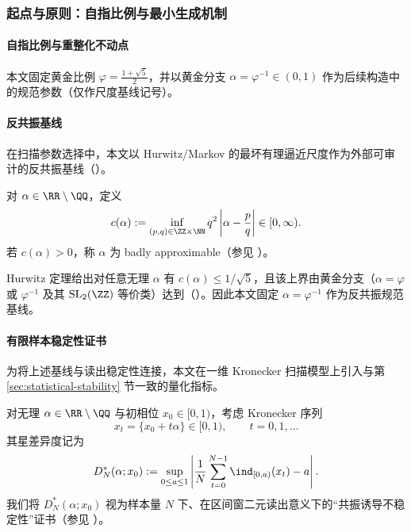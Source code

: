 \subsubsection{起点与原则：自指比例与最小生成机制}

\paragraph{自指比例与重整化不动点}

本文固定黄金比例 \(\varphi=\frac{1+\sqrt5}{2}\)，并以黄金分支 \(\alpha=\varphi^{-1}\in(0,1)\) 作为后续构造中的规范参数（仅作尺度基线记号）。

\paragraph{反共振基线}

在扫描参数选择中，本文以 Hurwitz/Markov 的最坏有理逼近尺度作为外部可审计的反共振基线（\cite{Cassels1957,KuipersNiederreiter1974}）。

\begin{definition}\label{def:markov-constant}
对 $\alpha\in\RR\setminus\QQ$，定义
\[
c(\alpha):=\inf_{(p,q)\in\ZZ\times\NN} q^2\left|\alpha-\frac{p}{q}\right|\in[0,\infty).
\]
若 $c(\alpha)>0$，称 $\alpha$ 为 badly approximable（参见 \cite{Cassels1957,KuipersNiederreiter1974}）。
\end{definition}

Hurwitz 定理给出对任意无理 $\alpha$ 有 $c(\alpha)\le 1/\sqrt5$，且该上界由黄金分支（$\alpha=\varphi$ 或 $\varphi^{-1}$ 及其 $\mathrm{SL}_2(\ZZ)$ 等价类）达到（\cite{Cassels1957,KuipersNiederreiter1974}）。因此本文固定 $\alpha=\varphi^{-1}$ 作为反共振规范基线。

\paragraph{有限样本稳定性证书}

为将上述基线与读出稳定性连接，本文在一维 Kronecker 扫描模型上引入与第 \ref{sec:statistical-stability} 节一致的量化指标。

\begin{definition}\label{def:instability-envelope}
对无理 $\alpha\in\RR\setminus\QQ$ 与初相位 $x_0\in[0,1)$，考虑 Kronecker 序列
\[
x_t=\{x_0+t\alpha\}\in[0,1),\qquad t=0,1,\dots
\]
其星差异度记为
\[
D_N^*(\alpha;x_0):=\sup_{0\le a\le 1}\left|\frac1N\sum_{t=0}^{N-1}\ind_{[0,a)}(x_t)-a\right|.
\]
我们将 $D_N^*(\alpha;x_0)$ 视为样本量 $N$ 下、在区间窗二元读出意义下的“共振诱导不稳定性”证书（参见 \cite{KuipersNiederreiter1974}）。
\end{definition}

